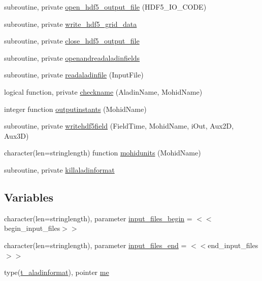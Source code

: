 \begin{DoxyCompactItemize}
\item 
subroutine, private \mbox{\hyperlink{namespacemodulealadinformat_a554b3cf12b5ecedce22b2e607f931c70}{open\+\_\+hdf5\+\_\+output\+\_\+file}} (H\+D\+F5\+\_\+\+I\+O\+\_\+\+C\+O\+DE)
\item 
subroutine, private \mbox{\hyperlink{namespacemodulealadinformat_aae0b88b8feec26aab01ab56220392544}{write\+\_\+hdf5\+\_\+grid\+\_\+data}}
\item 
subroutine, private \mbox{\hyperlink{namespacemodulealadinformat_af21c9df5cd692b1f56a959cc52cba7d8}{close\+\_\+hdf5\+\_\+output\+\_\+file}}
\item 
subroutine, private \mbox{\hyperlink{namespacemodulealadinformat_a2b65697a3c42c8dc546ebf63e260e98f}{openandreadaladinfields}}
\item 
subroutine, private \mbox{\hyperlink{namespacemodulealadinformat_a01a53a6349fe1f7a1e5973e60abcf19d}{readaladinfile}} (Input\+File)
\item 
logical function, private \mbox{\hyperlink{namespacemodulealadinformat_ad07bce7e401d49446a1fcfabb4bb4fa8}{checkname}} (Aladin\+Name, Mohid\+Name)
\item 
integer function \mbox{\hyperlink{namespacemodulealadinformat_aa8356f98f813a0fe5edb9089053dc372}{outputinstants}} (Mohid\+Name)
\item 
subroutine, private \mbox{\hyperlink{namespacemodulealadinformat_a9b5030d175b249bcc7e4f88c7e8bffec}{writehdf5field}} (Field\+Time, Mohid\+Name, i\+Out, Aux2D, Aux3D)
\item 
character(len=stringlength) function \mbox{\hyperlink{namespacemodulealadinformat_a0e28e132a765a53e91eb16cf638b0b32}{mohidunits}} (Mohid\+Name)
\item 
subroutine, private \mbox{\hyperlink{namespacemodulealadinformat_a5391156d679edf14a9f2631410182102}{killaladinformat}}
\end{DoxyCompactItemize}
\subsection*{Variables}
\begin{DoxyCompactItemize}
\item 
character(len=stringlength), parameter \mbox{\hyperlink{namespacemodulealadinformat_a4e98c66850b0ed94ddb033e7aa090e44}{input\+\_\+files\+\_\+begin}} = \textquotesingle{}$<$$<$begin\+\_\+input\+\_\+files$>$$>$\textquotesingle{}
\item 
character(len=stringlength), parameter \mbox{\hyperlink{namespacemodulealadinformat_a1b5e192f0393399d4e3f5ee7791fef49}{input\+\_\+files\+\_\+end}} = \textquotesingle{}$<$$<$end\+\_\+input\+\_\+files$>$$>$\textquotesingle{}
\item 
type(\mbox{\hyperlink{structmodulealadinformat_1_1t__aladinformat}{t\+\_\+aladinformat}}), pointer \mbox{\hyperlink{namespacemodulealadinformat_a3680b6b225bce535beb96cad9fff81cb}{me}}
\end{DoxyCompactItemize}


